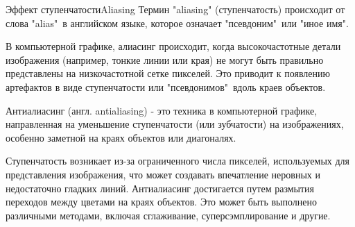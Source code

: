 \documentclass{beamer}
\begin{document}
	\begin{frame}{Эффект ступенчатости}{Aliasing}
		Термин "aliasing" (ступенчатость) происходит от слова "alias"\ в английском языке, которое означает "псевдоним"\ или "иное имя". 
		
		{\footnotesize
		В компьютерной графике, алиасинг происходит, когда высокочастотные детали изображения (например, тонкие линии или края) не могут быть правильно представлены на низкочастотной сетке пикселей. 
		Это приводит к появлению артефактов в виде ступенчатости или "псевдонимов"\ вдоль краев объектов. 
		}
		
		Антиалиасинг (англ. antialiasing) - это техника в компьютерной графике, направленная на уменьшение ступенчатости (или зубчатости) на изображениях, особенно заметной на краях объектов или диагоналях. 
				
		{\footnotesize
		Ступенчатость возникает из-за ограниченного числа пикселей, используемых для представления изображения, что может создавать впечатление неровных и недостаточно гладких линий.
		Антиалиасинг достигается путем размытия переходов между цветами на краях объектов. Это может быть выполнено различными методами, включая сглаживание, суперсэмплирование и другие. %
		}

	\end{frame}
\end{document}
